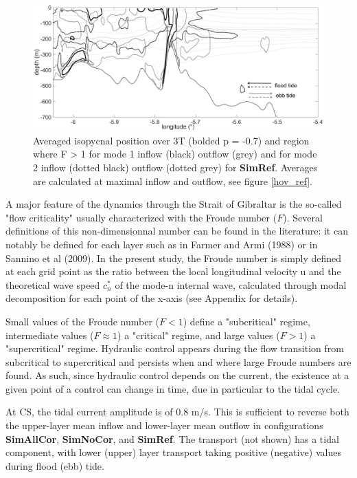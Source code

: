 \begin{figure}[!h]
 \centering
 \includegraphics[width=1\textwidth]{./papier2D/Fn_1-2_ref_3T.png}
 \caption{Averaged isopycnal position over 3T (bolded p = -0.7) and region where F > 1 for mode 1 inflow (black) outflow (grey) and for mode 2 inflow (dotted black) outflow (dotted grey) for \textbf{SimRef}. Averages are calculated at maximal inflow and outflow, see figure \ref{hov_ref}.}
 \label{fig_fn_ref}
\end{figure}

A major feature of the dynamics through the Strait of Gibraltar is the so-called "flow criticality" usually characterized with the Froude number ($F$). Several definitions of this non-dimensionnal number can be found in the literature: it can notably be defined for each layer such as in Farmer and Armi (1988) or in Sannino et al (2009). In the present study, the Froude number is simply defined at each grid point as the ratio between the local longitudinal velocity u and the theoretical wave speed $c^*_n$ of the mode-n internal wave, calculated through modal decomposition for each point of the x-axis (see Appendix for details).

Small values of the Froude number ($F < 1$) define a "subcritical" regime, intermediate values ($F \approx 1$) a "critical" regime, and large values ($F>1$) a "supercritical" regime. Hydraulic control appears during the flow transition from subcritical to supercritical and persists when and where large Froude numbers are found. As such, since hydraulic control depends on the current, the existence at a given point of a control can change in time, due in particular to the tidal cycle.

At CS, the tidal current amplitude is of 0.8 m/s. This is sufficient to reverse both the upper-layer mean inflow and lower-layer mean outflow in configurations \textbf{SimAllCor}, \textbf{SimNoCor}, and \textbf{SimRef}. 
The transport (not shown) has a tidal component, with lower (upper) layer transport taking positive (negative) values during flood (ebb) tide. 

